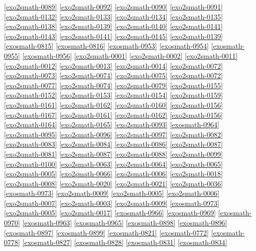 \ref{exo2smath-0089}
\ref{exo2smath-0092}
\ref{exo2smath-0090}
\ref{exo2smath-0091}
\ref{exo2smath-0132}
\ref{exo2smath-0133}
\ref{exo2smath-0134}
\ref{exo2smath-0135}
\ref{exo2smath-0138}
\ref{exo2smath-0139}
\ref{exo2smath-0140}       %
\ref{exo2smath-0141}
\ref{exo2smath-0143}
\ref{exo2smath-0141}
\ref{exo2smath-0145}
\ref{exo2smath-0139}
\ref{exosmath-0815}
\ref{exosmath-0816}
\ref{exosmath-0953}
\ref{exosmath-0954}
\ref{exosmath-0955}
\ref{exosmath-0956}
\ref{exo2smath-0001}  
\ref{exo2smath-0002}  
\ref{exo2smath-0011}       %
\ref{exo2smath-0012}  
\ref{exo2smath-0013}  
\ref{exo2smath-0014}  
\ref{exo2smath-0072}
\ref{exo2smath-0073}
\ref{exo2smath-0074}
\ref{exo2smath-0075}
\ref{exo2smath-0072}
\ref{exo2smath-0077}
\ref{exo2smath-0074}
\ref{exo2smath-0079}
\ref{exo2smath-0155}
\ref{exo2smath-0152}
\ref{exo2smath-0153}
\ref{exo2smath-0154}
\ref{exo2smath-0159}
\ref{exo2smath-0161}
\ref{exo2smath-0162}
\ref{exo2smath-0160}
\ref{exo2smath-0156}
\ref{exo2smath-0167}
\ref{exo2smath-0161}
\ref{exo2smath-0162}
\ref{exo2smath-0156}
\ref{exo2smath-0164}
\ref{exo2smath-0165}
\ref{exo2smath-0093}
\ref{exosmath-0964}
\ref{exo2smath-0095}
\ref{exo2smath-0096}
\ref{exo2smath-0097}
\ref{exo2smath-0082}
\ref{exo2smath-0083}
\ref{exo2smath-0084}
\ref{exo2smath-0086}
\ref{exo2smath-0087}
\ref{exo2smath-0081}
\ref{exo2smath-0087}
\ref{exo2smath-0088}
\ref{exo2smath-0099}
\ref{exo2smath-0100}
\ref{exo2smath-0063}
\ref{exo2smath-0064}
\ref{exo2smath-0065}
\ref{exo2smath-0005}  
\ref{exo2smath-0066}
\ref{exo2smath-0006} 
\ref{exo2smath-0018}
\ref{exo2smath-0008}  
\ref{exo2smath-0020}
\ref{exo2smath-0021}
\ref{exo2smath-0036}
\ref{exosmath-0973}    %
\ref{exo2smath-0009}  
\ref{exo2smath-0005}  
\ref{exo2smath-0006} 
\ref{exo2smath-0007}  
\ref{exo2smath-0003}  
\ref{exo2smath-0009}  
\ref{exosmath-0973}
\ref{exo2smath-0005}  
\ref{exo2smath-0017}
\ref{exosmath-0966}
\ref{exosmath-0969}
\ref{exosmath-0970}
\ref{exosmath-0963}
\ref{exosmath-0965}
\ref{exosmath-0898}
\ref{exosmath-0896}
\ref{exosmath-0897}
\ref{exosmath-0899}
\ref{exosmath-0821}
\ref{exosmath-0772}
\ref{exosmath-0778}
\ref{exosmath-0827}
\ref{exosmath-0828}
\ref{exosmath-0831}
\ref{exosmath-0834}


